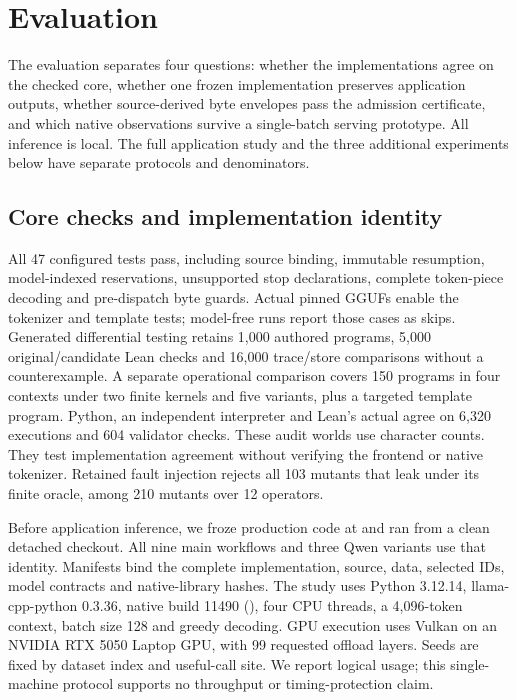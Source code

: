 \section{Evaluation}\label{sec:evaluation}

The evaluation separates four questions: whether the implementations agree on
the checked core, whether one frozen implementation preserves application
outputs, whether source-derived byte envelopes pass the admission certificate,
and which native observations survive a single-batch serving prototype.
All inference is local. The full application study and the three additional
experiments below have separate protocols and denominators.

\subsection{Core checks and implementation identity}

All 47 configured tests pass, including source binding, immutable resumption,
model-indexed reservations, unsupported stop declarations, complete token-piece
decoding and pre-dispatch byte guards. Actual pinned GGUFs enable the tokenizer
and template tests; model-free runs report those cases as skips.
Generated differential testing retains 1,000 authored programs, 5,000
original/candidate Lean checks and 16,000 trace/store comparisons without a
counterexample. A separate operational comparison covers 150 programs in four
contexts under two finite kernels and five variants, plus a targeted template
program. Python, an independent interpreter and Lean's actual  agree
on 6,320 executions and 604 validator checks. These audit worlds use character
counts. They test implementation agreement without verifying the frontend or
native tokenizer. Retained fault injection rejects all 103 mutants that leak
under its finite oracle, among 210 mutants over 12 operators.

Before application inference, we froze production code at  and ran
from a clean detached checkout. All nine main workflows and three Qwen variants
use that identity. Manifests bind the complete implementation, source, data,
selected IDs, model contracts and native-library hashes. The study uses Python
3.12.14, llama-cpp-python 0.3.36, native build 11490 (), four CPU
threads, a 4,096-token context, batch size 128 and greedy decoding. GPU execution
uses Vulkan on an NVIDIA RTX 5050 Laptop GPU, with 99 requested offload layers.
Seeds are fixed by dataset index and useful-call site. We report logical usage;
this single-machine protocol supports no throughput or timing-protection claim.

